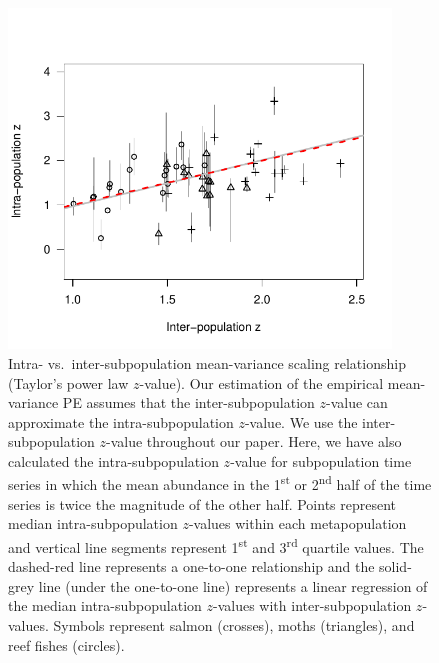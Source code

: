 \begin{figure}[htbp]
  \centering
  \includegraphics[width=4in]{prophets/inter-vs-intra-pop-z-seg-2-0-20121019.pdf}
  \caption[Intra- vs.\ inter-subpopulation mean-variance scaling relationship
    (Taylor's power law $z$-value).]{Intra- vs.\ inter-subpopulation mean-variance scaling relationship
    (Taylor's power law $z$-value).  Our estimation of the empirical
    mean-variance PE assumes that the inter-subpopulation $z$-value can
    approximate the intra-subpopulation $z$-value.  We use the
    inter-subpopulation $z$-value throughout our paper.  Here, we have also
    calculated the intra-subpopulation $z$-value for subpopulation time series
    in which the mean abundance in the 1\textsuperscript{st} or
    2\textsuperscript{nd} half of the time series is twice the magnitude of
    the other half.  Points represent median intra-subpopulation $z$-values
    within each metapopulation and vertical line segments represent
    1\textsuperscript{st} and 3\textsuperscript{rd} quartile values.  The
    dashed-red line represents a one-to-one relationship and the solid-grey
    line (under the one-to-one line) represents a linear regression of the
    median intra-subpopulation $z$-values with inter-subpopulation $z$-values.
    Symbols represent salmon (crosses), moths (triangles), and reef fishes
    (circles).}
  \label{fig:inter-vs-intra-z}
\end{figure}


